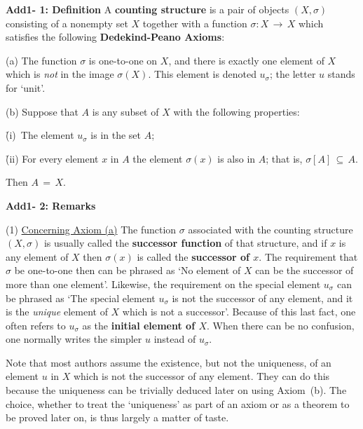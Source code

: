 \V

        {\bf Add1- 1: Definition} A {\bf counting structure} is a pair of objects $(X,{\sigma})$ consisting of a nonempty set $X$ together with a function ${\sigma}:X \,{\rightarrow}\, X$ which satisfies the following {\bf Dedekind-Peano Axioms}:

\V

        (a) The function ${\sigma}$ is one-to-one on $X$, and there is exactly one element of $X$ which is {\em not} in the image ${\sigma}(X)$.
    This element is denoted $u_{{\sigma}}$; the letter $u$ stands for `unit'.

\V

        (b) Suppose that $A$ is any subset of $X$ with the following properties:

            \h (i)\, The element $u_{{\sigma}}$ is in the set $A$;

            \h (ii)  For every element $x$ in $A$ the element ${\sigma}(x)$ is also in $A$;
    that is, ${\sigma}[A] \,{\subseteq}\, A$.

\noindent Then $A \,=\, X$.

\V


        {\bf Add1- 2: Remarks}

        (1) \underline{Concerning Axiom (a)} The function ${\sigma}$ associated with the counting structure $(X,{\sigma})$ is usually called the {\bf successor function} of that structure,
    and if $x$ is any element of $X$ then ${\sigma}(x)$ is called the {\bf successor of $x$}.
    The requirement that ${\sigma}$ be one-to-one then can be phrased as `No  element of $X$ can be the successor of more than one element'.
    Likewise, the requirement on the special element $u_{{\sigma}}$ can be phrased as `The special element $u_{{\sigma}}$ is not the successor of any element, and it is the {\em unique} element of $X$ which is not a successor'.
    Because of this last fact, one often refers to $u_{{\sigma}}$ as the {\bf initial element of $X$}.
    When there can be no confusion, one normally writes the simpler $u$ instead of $u_{{\sigma}}$.

        Note that most authors assume the existence, but not the uniqueness, of an element $u$ in $X$ which is not the successor of any element.
    They can do this because the uniqueness can be trivially deduced later on using Axiom~(b).
    The choice, whether to treat the `uniqueness' as part of an axiom or as a theorem to be proved later on, is thus largely a matter of taste.

